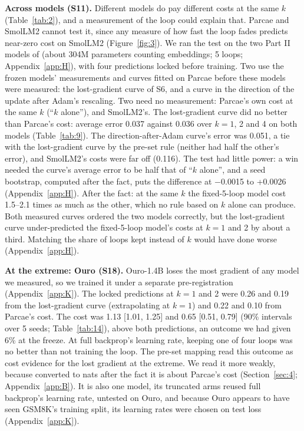 \documentclass[10pt]{article}
\begin{document}
\textbf{Across models (S11).} Different models do pay different costs at the same $k$ (Table~\ref{tab:2}), and a measurement of the loop could explain that. Parcae and SmolLM2 cannot test it, since any measure of how fast the loop fades predicts near-zero cost on SmolLM2 (Figure~\ref{fig:3}). We ran the test on the two Part II models of \citet{huang2026partii} (about 304M parameters counting embeddings; 5 loops; Appendix~\ref{app:H}), with four predictions locked before training. Two use the frozen models' measurements and curves fitted on Parcae before these models were measured: the lost-gradient curve of S6, and a curve in the direction of the update after Adam's rescaling. Two need no measurement: Parcae's own cost at the same $k$ (``$k$ alone''), and SmolLM2's. The lost-gradient curve did no better than Parcae's cost: average error 0.037 against 0.036 over $k = 1$, 2 and 4 on both models (Table~\ref{tab:9}). The direction-after-Adam curve's error was 0.051, a tie with the lost-gradient curve by the pre-set rule (neither had half the other's error), and SmolLM2's costs were far off (0.116). The test had little power: a win needed the curve's average error to be half that of ``$k$ alone'', and a seed bootstrap, computed after the fact, puts the difference at $-$0.0015 to +0.0026 (Appendix~\ref{app:H}). After the fact: at the same $k$ the fixed-5-loop model cost 1.5--2.1 times as much as the other, which no rule based on $k$ alone can produce. Both measured curves ordered the two models correctly, but the lost-gradient curve under-predicted the fixed-5-loop model's costs at $k = 1$ and 2 by about a third. Matching the share of loops kept instead of $k$ would have done worse (Appendix~\ref{app:H}).

\textbf{At the extreme: Ouro (S18).} Ouro-1.4B loses the most gradient of any model we measured, so we trained it under a separate pre-registration (Appendix~\ref{app:K}). The locked predictions at $k = 1$ and 2 were 0.26 and 0.19 from the lost-gradient curve (extrapolating at $k = 1$) and 0.22 and 0.10 from Parcae's cost. The cost was 1.13 [1.01, 1.25] and 0.65 [0.51, 0.79] (90\% intervals over 5 seeds; Table~\ref{tab:14}), above both predictions, an outcome we had given 6\% at the freeze. At full backprop's learning rate, keeping one of four loops was no better than not training the loop. The pre-set mapping read this outcome as cost evidence for the lost gradient at the extreme. We read it more weakly, because converted to nats after the fact it is about Parcae's cost (Section~\ref{sec:4}; Appendix~\ref{app:B}). It is also one model, its truncated arms reused full backprop's learning rate, untested on Ouro, and because Ouro appears to have seen GSM8K's training split, its learning rates were chosen on test loss (Appendix~\ref{app:K}).
\end{document}
